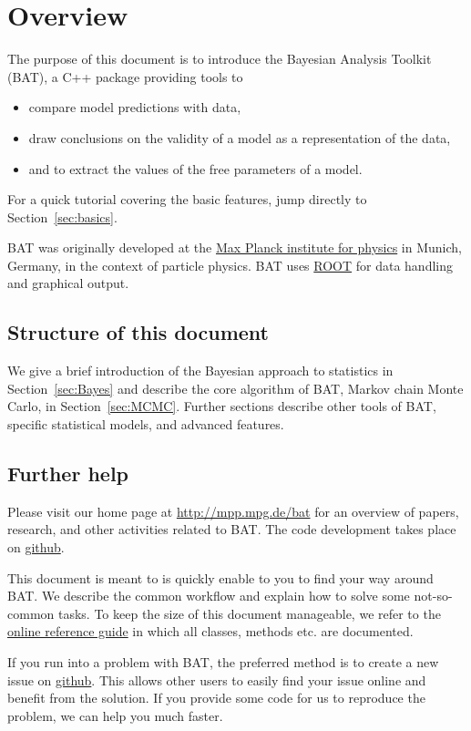 \documentclass[
12pt,
a4paper,
bibliography=totoc,
captions=nooneline, %
numbers=noenddot,
twoside]{scrbook}
\newcommand{\BAT}{{\scshape BAT}\xspace}
\newcommand{\ROOT}{{\scshape ROOT}\xspace}
\newcommand{\BATurl}{http://mpp.mpg.de/bat}
\newcommand{\BATgithub}{https://github.com/bat/bat}
\newcommand{\ROOTurl}{https://root.cern.ch/}
\def \refsec#1{Section~\ref{sec:#1}}
\begin{document}
\section*{Overview}

The purpose of this document is to introduce the Bayesian Analysis
Toolkit (\BAT), a C++ package providing tools to
\begin{itemize}
  \item compare model predictions with data,
  \item draw conclusions on the validity of a model as a representation of the data,
  \item and to extract the values of the free parameters of a model.
\end{itemize}
For a quick tutorial covering the basic features, jump directly to
\refsec{basics}.

\BAT was originally developed at the \href{http://mpp.mpg.de}{Max
  Planck institute for physics} in Munich, Germany, in the context of
particle physics. \BAT uses \href{\ROOTurl}{\ROOT} for data handling and graphical
output.

\subsection*{Structure of this document}

We give a brief introduction of the Bayesian approach to statistics in
\refsec{Bayes} and describe the core algorithm of \BAT, Markov chain
Monte Carlo, in \refsec{MCMC}. Further sections describe other tools
of \BAT, specific statistical models, and advanced features.

\subsection*{Further help}

Please visit our home page at \url{\BATurl} for an overview of papers,
research, and other activities related to \BAT. The code development
takes place on \href{\BATgithub}{github}.

This document is meant to is quickly enable to you to find your way
around \BAT. We describe the common workflow and explain how to solve
some not-so-common tasks. To keep the size of this document
manageable, we refer to the \href{\BATurl/docs/refman/latest/}{online
  reference guide} in which all classes, methods etc. are documented.

If you run into a problem with \BAT, the preferred method is to create
a new issue on \href{\BATgithub/issues}{github}. This allows other
users to easily find your issue online and benefit from the
solution. If you provide some code for us to reproduce the problem, we
can help you much faster.
\end{document}
